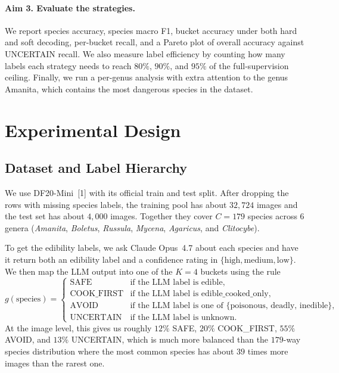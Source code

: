 \documentclass[11pt]{article}
\begin{document}
\paragraph{Aim 3. Evaluate the strategies.}
We report species accuracy, species macro F1, bucket accuracy under both
hard and soft decoding, per-bucket recall, and a Pareto plot of overall
accuracy against UNCERTAIN recall. We also measure label efficiency by
counting how many labels each strategy needs to reach $80\%$, $90\%$, and
$95\%$ of the full-supervision ceiling. Finally, we run a per-genus analysis
with extra attention to the genus Amanita, which contains the most
dangerous species in the dataset.


\section{Experimental Design}

\subsection{Dataset and Label Hierarchy}

We use DF20-Mini~[1] with its official train and test split. After dropping
the rows with missing species labels, the training pool has about $32{,}724$
images and the test set has about $4{,}000$ images. Together they cover
$C=179$ species across $6$ genera (\emph{Amanita}, \emph{Boletus},
\emph{Russula}, \emph{Mycena}, \emph{Agaricus}, and \emph{Clitocybe}).

To get the edibility labels, we ask Claude Opus~4.7 about each species and
have it return both an edibility label and a confidence rating in
$\{\text{high}, \text{medium}, \text{low}\}$. We then map the LLM output
into one of the $K=4$ buckets using the rule
\[
g(\text{species}) =
\begin{cases}
\text{SAFE} & \text{if the LLM label is } \text{edible},\\
\text{COOK\_FIRST} & \text{if the LLM label is } \text{edible\_cooked\_only},\\
\text{AVOID} & \text{if the LLM label is one of } \{\text{poisonous, deadly, inedible}\},\\
\text{UNCERTAIN} & \text{if the LLM label is } \text{unknown}.
\end{cases}
\]
At the image level, this gives us roughly $12\%$ SAFE, $20\%$ COOK\_FIRST,
$55\%$ AVOID, and $13\%$ UNCERTAIN, which is much more balanced than the
$179$-way species distribution where the most common species has about
$39$ times more images than the rarest one.
\end{document}
